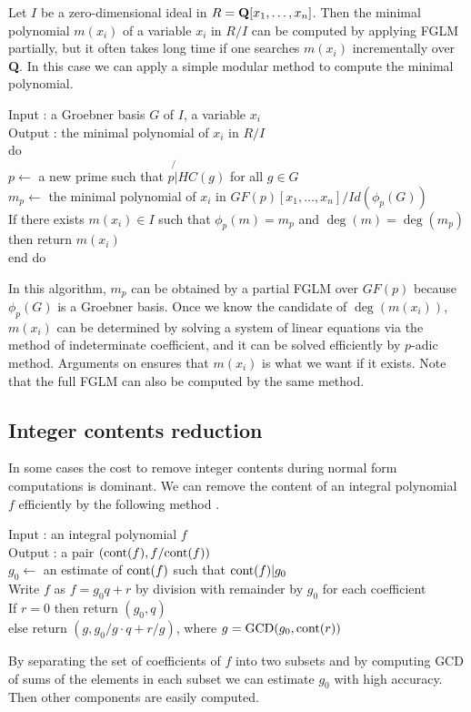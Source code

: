 \documentclass[runningheads]{cl2emult}
\def\cont{{\rm cont}}
\def\GCD{{\rm GCD}}
\begin{document}
Let $I$ be a zero-dimensional ideal in $R={\bf Q}[x_1,\ldots,x_n]$.
Then the minimal polynomial $m(x_i)$ of a variable $x_i$ in $R/I$ can
be computed by applying FGLM partially, but it often takes long
time if one searches $m(x_i)$ incrementally over {\bf Q}.  In this
case we can apply a simple modular method to compute the minimal
polynomial.
\begin{tabbing}
Input : a Groebner basis $G$ of $I$, a variable $x_i$\\
Output : the minimal polynomial of $x_i$ in $R/I$\\
do \= \\
\> $p \leftarrow$ a new prime such that $p \not{|} HC(g)$ for all $g \in G$\\
\> $m_p \leftarrow$ the minimal polynomial of $x_i$ in $GF(p)[x_1,\ldots,x_n]/Id(\phi_p(G))$\\
\> If there exists $m(x_i) \in I$ such that $\phi_p(m) = m_p$ and $\deg(m)=\deg(m_p)$\\
\> then return $m(x_i)$\\
end do
\end{tabbing}
In this algorithm, $m_p$ can be obtained by a partial FGLM over
$GF(p)$ because $\phi_p(G)$ is a Groebner basis. Once we know the
candidate of $\deg(m(x_i))$, $m(x_i)$ can be determined by solving a
system of linear equations via the method of indeterminate
coefficient, and it can be solved efficiently by $p$-adic method.
Arguments on \cite{noro:NOYO} ensures that $m(x_i)$ is what we want if it
exists. Note that the full FGLM can also be computed by the same
method.

\subsection{Integer contents reduction}
\label{sec:gbcont}

In some cases the cost to remove integer contents during normal form
computations is dominant. We can remove the content of an integral
polynomial $f$ efficiently by the following method \cite{noro:REPL}.
\begin{tabbing}
Input : an integral polynomial $f$\\
Output : a pair $(\cont(f),f/\cont(f))$\\
$g_0 \leftarrow$ an estimate of $\cont(f)$ such that $\cont(f)|g_0$\\
Write $f$ as $f = g_0q+r$ by division with remainder by $g_0$ for each coefficient\\
If $r = 0$ then return $(g_0,q)$\\
else return $(g,g_0/g \cdot q + r/g)$, where $g = \GCD(g_0,\cont(r))$
\end{tabbing}
By separating the set of coefficients of $f$ into two subsets and by
computing GCD of sums of the elements in each subset we can estimate
$g_0$ with high accuracy. Then other components are easily computed.
\end{document}
